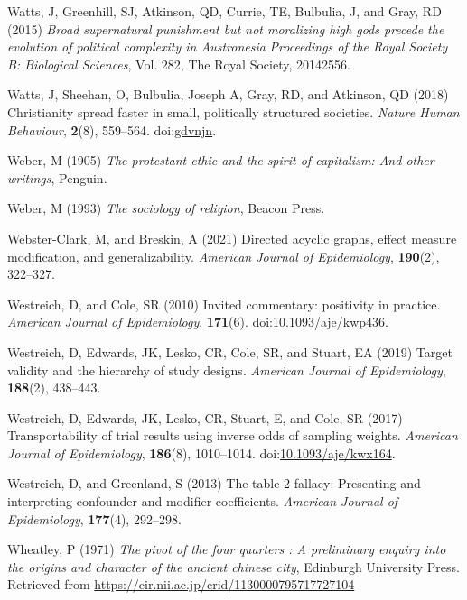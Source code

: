\documentclass[
  single column]{article}
\newlength{\cslhangindent}
\newenvironment{CSLReferences}[2] %
 {\begin{list}{}{%
  \setlength{\itemindent}{0pt}
  \setlength{\leftmargin}{0pt}
  \setlength{\parsep}{0pt}
  \ifodd #1
   \setlength{\leftmargin}{\cslhangindent}
   \setlength{\itemindent}{-1\cslhangindent}
  \fi
  \setlength{\itemsep}{#2\baselineskip}}}
 {\end{list}}
\begin{document}
\begin{CSLReferences}{1}{0}
Watts, J, Greenhill, SJ, Atkinson, QD, Currie, TE, Bulbulia, J, and
Gray, RD (2015) \emph{Broad supernatural punishment but not moralizing
high gods precede the evolution of political complexity in
{A}ustronesia} \emph{Proceedings of the Royal Society B: Biological
Sciences}, Vol. 282, The Royal Society, 20142556.

Watts, J, Sheehan, O, Bulbulia, Joseph A, Gray, RD, and Atkinson, QD
(2018) Christianity spread faster in small, politically structured
societies. \emph{Nature Human Behaviour}, \textbf{2}(8), 559--564.
doi:\href{https://doi.org/gdvnjn}{gdvnjn}.

Weber, M (1905) \emph{The protestant ethic and the spirit of capitalism:
And other writings}, Penguin.

Weber, M (1993) \emph{The sociology of religion}, Beacon Press.

Webster-Clark, M, and Breskin, A (2021) Directed acyclic graphs, effect
measure modification, and generalizability. \emph{American Journal of
Epidemiology}, \textbf{190}(2), 322--327.

Westreich, D, and Cole, SR (2010) Invited commentary: positivity in
practice. \emph{American Journal of Epidemiology}, \textbf{171}(6).
doi:\href{https://doi.org/10.1093/aje/kwp436}{10.1093/aje/kwp436}.

Westreich, D, Edwards, JK, Lesko, CR, Cole, SR, and Stuart, EA (2019)
Target validity and the hierarchy of study designs. \emph{American
Journal of Epidemiology}, \textbf{188}(2), 438--443.

Westreich, D, Edwards, JK, Lesko, CR, Stuart, E, and Cole, SR (2017)
Transportability of trial results using inverse odds of sampling
weights. \emph{American Journal of Epidemiology}, \textbf{186}(8),
1010--1014.
doi:\href{https://doi.org/10.1093/aje/kwx164}{10.1093/aje/kwx164}.

Westreich, D, and Greenland, S (2013) The table 2 fallacy: Presenting
and interpreting confounder and modifier coefficients. \emph{American
Journal of Epidemiology}, \textbf{177}(4), 292--298.

Wheatley, P (1971) \emph{The pivot of the four quarters : A preliminary
enquiry into the origins and character of the ancient chinese city},
Edinburgh University Press. Retrieved from
\url{https://cir.nii.ac.jp/crid/1130000795717727104}


\end{CSLReferences}
\end{document}
